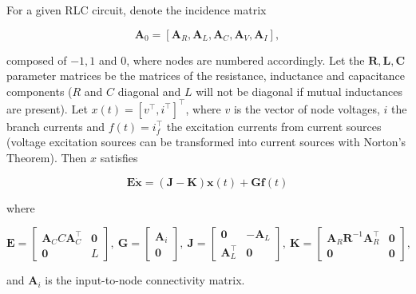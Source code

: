 \begin{theorem}\label{theo:generic_rlc_modelling} %
	For a given RLC circuit, denote the incidence matrix

\begin{equation} \mathbf{A}_0 =  \left[\mathbf{A}_R,\mathbf{A}_L,\mathbf{A}_C,\mathbf{A}_V,\mathbf{A}_I\right], \end{equation}

	\noindent composed of $-1,1$ and $0$, where nodes are numbered accordingly. Let the $\mathbf{R,L,C}$ parameter matrices be the matrices of the resistance, inductance and capacitance components ($R$ and $C$ diagonal and $L$ will not be diagonal if mutual inductances are present). Let $x(t) = \left[v^\intercal,i^\intercal\right]^\intercal$, where $v$ is the vector of node voltages, $i$ the branch currents and $f(t) = i_f^\intercal$ the excitation currents from current sources (voltage excitation sources can be transformed into current sources with Norton's Theorem). Then $x$ satisfies

\begin{equation} \mathbf{E}\dot{\mathbf{x}} = \left(\mathbf{J-K}\right)\mathbf{x}(t) + \mathbf{Gf}(t) \label{eq:linear_circuit_linear_system}\end{equation}

	where

\begin{equation} \mathbf{E} = \left[\begin{array}{cc} \mathbf{A}_C C \mathbf{A}_C^\intercal & \mathbf{0}\\[1mm] \mathbf{0} & L \end{array}\right],\ \mathbf{G} = \left[\begin{array}{c} \mathbf{A}_i \\ \mathbf{0} \end{array}\right],\ \mathbf{J} = \left[\begin{array}{cc} \mathbf{0} & -\mathbf{A}_L \\[1mm] \mathbf{A}_L^\intercal & \mathbf{0} \end{array}\right],\ \mathbf{K} = \left[\begin{array}{cc} \mathbf{A}_R \mathbf{R}^{-1}  \mathbf{A}_R^\intercal & \mathbf{0} \\[1mm] \mathbf{0} & \mathbf{0} \end{array}\right] ,\end{equation}

	\noindent and $\mathbf{A}_i$ is the input-to-node connectivity matrix.
\end{theorem} %

